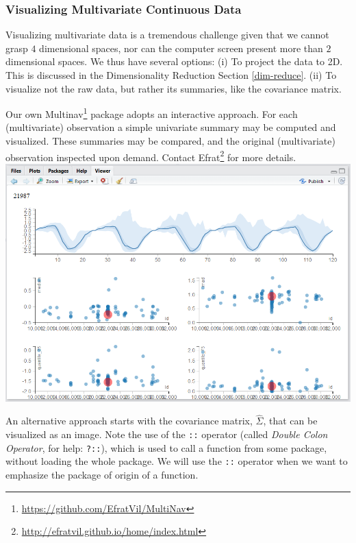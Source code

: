 \documentclass[]{book}
\renewcommand{\href}[2]{#2\footnote{\url{#1}}}
\theoremstyle{definition}
\theoremstyle{definition}
\theoremstyle{definition}
\theoremstyle{remark}
\begin{document}
\hypertarget{visualizing-multivariate-continuous-data}{%
\subsubsection{Visualizing Multivariate Continuous Data}\label{visualizing-multivariate-continuous-data}}

Visualizing multivariate data is a tremendous challenge given that we cannot grasp \(4\) dimensional spaces, nor can the computer screen present more than \(2\) dimensional spaces.
We thus have several options:
(i) To project the data to 2D. This is discussed in the Dimensionality Reduction Section \ref{dim-reduce}.
(ii) To visualize not the raw data, but rather its summaries, like the covariance matrix.

Our own \href{https://github.com/EfratVil/MultiNav}{Multinav} package adopts an interactive approach.
For each (multivariate) observation a simple univariate summary may be computed and visualized.
These summaries may be compared, and the original (multivariate) observation inspected upon demand.
Contact \href{http://efratvil.github.io/home/index.html}{Efrat} for more details.\\
\includegraphics{art/multinav.png}

An alternative approach starts with the covariance matrix, \(\hat \Sigma\), that can be visualized as an image.
Note the use of the \texttt{::} operator (called \emph{Double Colon Operator}, for help: \texttt{?\textquotesingle{}::\textquotesingle{}}), which is used to call a function from some package, without loading the whole package.
We will use the \texttt{::} operator when we want to emphasize the package of origin of a function.
\end{document}
